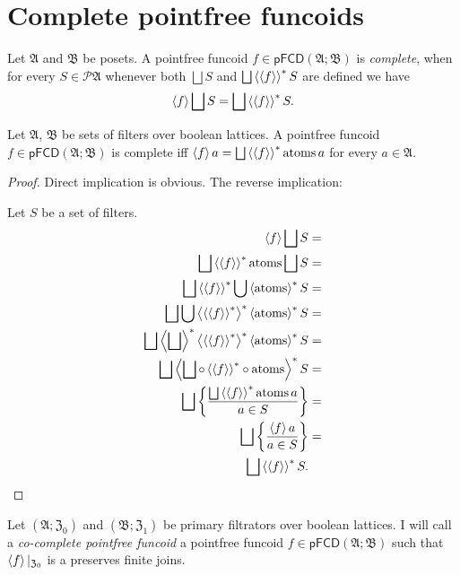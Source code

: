 \section{Complete pointfree funcoids}
\begin{defn}
Let $\mathfrak{A}$ and $\mathfrak{B}$
be posets. A pointfree funcoid $f\in\mathsf{pFCD}(\mathfrak{A};\mathfrak{B})$
is \emph{complete}, when for every $S\in\mathscr{P}\mathfrak{A}$
whenever both $\bigsqcup S$ and $\bigsqcup\left\langle \left\langle f\right\rangle\right\rangle ^{\ast}S$
are defined we have
\[
\left\langle f\right\rangle\bigsqcup S=\bigsqcup\left\langle \left\langle f\right\rangle\right\rangle ^{\ast}S.
\]
\end{defn}
\begin{prop}
Let $\mathfrak{A}$, $\mathfrak{B}$ be sets of filters over boolean
lattices. A pointfree funcoid $f\in\mathsf{pFCD}(\mathfrak{A};\mathfrak{B})$
is complete iff $\left\langle f\right\rangle a=\bigsqcup\left\langle \left\langle f\right\rangle\right\rangle ^{\ast}\operatorname{atoms} a$
for every $a\in\mathfrak{A}$.\end{prop}
\begin{proof}
Direct implication is obvious. The reverse implication:

Let $S$ be a set of filters.
\begin{align*}
\left\langle f\right\rangle\bigsqcup S & =\\
\bigsqcup\left\langle \left\langle f\right\rangle\right\rangle ^{\ast}\operatorname{atoms}\bigsqcup S & =\\
\bigsqcup\left\langle \left\langle f\right\rangle\right\rangle ^{\ast}\bigcup\left\langle \operatorname{atoms}\right\rangle ^{\ast}S & =\\
\bigsqcup\bigcup\left\langle \left\langle \left\langle f\right\rangle\right\rangle ^{\ast}\right\rangle ^{\ast}\left\langle \operatorname{atoms}\right\rangle ^{\ast}S & =\\
\bigsqcup\left\langle \bigsqcup\right\rangle ^{\ast}\left\langle \left\langle \left\langle f\right\rangle\right\rangle ^{\ast}\right\rangle ^{\ast}\left\langle \operatorname{atoms}\right\rangle ^{\ast}S & =\\
\bigsqcup\left\langle \bigsqcup\circ\left\langle \left\langle f\right\rangle\right\rangle ^{\ast}\circ\operatorname{atoms}\right\rangle ^{\ast}S & =\\
\bigsqcup\left\{ \frac{\bigsqcup\left\langle \left\langle f\right\rangle\right\rangle ^{\ast}\operatorname{atoms} a}{a\in S}\right\} & =\\
\bigsqcup\left\{ \frac{\left\langle f\right\rangle a}{a\in S}\right\} & =\\
\bigsqcup\left\langle \left\langle f\right\rangle\right\rangle ^{\ast}S.
\end{align*}
\end{proof}
\begin{defn}
Let $(\mathfrak{A};\mathfrak{Z}_{0})$
and $(\mathfrak{B};\mathfrak{Z}_{1})$ be primary filtrators over
boolean lattices. I will call a \emph{co-complete pointfree funcoid}
a pointfree funcoid $f\in\mathsf{pFCD}(\mathfrak{A};\mathfrak{B})$
such that $\left\langle f\right\rangle|_{\mathfrak{Z}_{0}}$ is a preserves finite joins.\end{defn}
